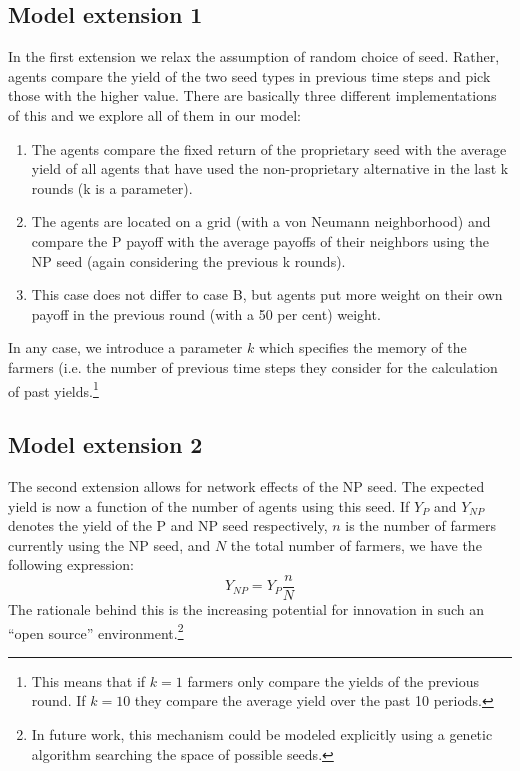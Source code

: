 \documentclass[11pt,a4paper]{article}
\begin{document}
\subsection{Model extension 1}
In the first extension we relax the assumption of random choice of seed.
Rather, agents compare the yield of the two seed types in previous time steps and pick those with the higher value.
There are basically three different implementations of this and we explore all of them in our model:
\begin{enumerate}
\item  The agents compare the fixed return of the proprietary seed with the average yield of all agents that have used the non-proprietary alternative in the last k rounds (k is a parameter).
\item The agents are located on a grid (with a von Neumann neighborhood) and compare the P payoff with the average payoffs of their neighbors using the NP seed (again considering the previous k rounds).
\item This case does not differ to case B, but agents put more weight on their own payoff in the previous round (with a 50 per cent) weight.
\end{enumerate}
In any case, we introduce a parameter $k$ which specifies the memory of the farmers (i.e. the number of previous time steps they consider for the calculation of past yields.\footnote{This means that if $k=1$ farmers only compare the yields of the previous round. If $k=10$ they compare the average yield over the past 10 periods.}

\subsection{Model extension 2}
The second extension allows for network effects of the NP seed. 
The expected yield is now a function of the number of agents using this seed.
If $Y_P$ and $Y_{NP}$ denotes the yield of the P and NP seed respectively, $n$ is the number of farmers currently using the NP seed, and $N$ the total number of farmers, we have the following expression:
\begin{equation}
Y_{NP} =  Y_P \frac{n}{N}
\end{equation}
The rationale behind this is the increasing potential for innovation in such an ``open source'' environment.\footnote{In future work, this mechanism could be modeled explicitly using a genetic algorithm searching the space of possible seeds.}
\end{document}
